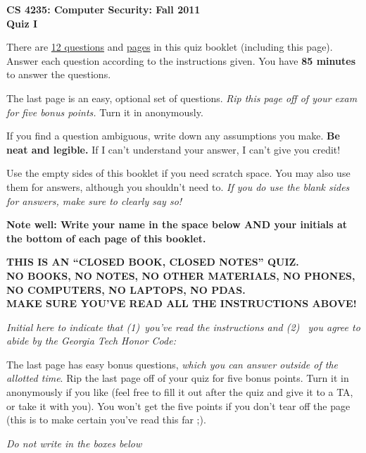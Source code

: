 \documentclass[11pt]{article}
\newcounter{answer}
\begin{document}
\begin{center}
{\Large{\bf CS 4235: Computer Security: Fall 2011} \\
 \vspace{.15in} \Huge{\bf Quiz I}} 
\vspace{.2in}

\begin{boxedminipage}[h]{6in}
There are \underline{12 questions} and
  \underline{\pageref{lastpage} pages} in this quiz booklet (including
  this page).  Answer each question according to the instructions given.
  You have {\bf 85 minutes} to answer the questions.

\vspace{.1in} The last page is an easy, optional set of questions.  {\em
  Rip this page off of your exam for five bonus points.}  Turn it in
anonymously.


\vspace{.1in} 
If you find a question ambiguous, write down any
assumptions you make.  {\bf Be neat and legible.}  If I can't
understand your answer, I can't give you credit!  

\vspace{.1in} 
Use the empty sides of this booklet if you need scratch space.  You
may also use them for answers, although you shouldn't need to.  {\em If you
do use the blank sides for answers, make sure to clearly say so!}

\vspace{.1in} 
{\bf Note well: Write your name in the space below AND your initials at the bottom of each
page of this booklet.}

\begin{center}{\bf THIS IS AN ``CLOSED BOOK, CLOSED NOTES'' QUIZ.\\
NO BOOKS, NO NOTES, NO OTHER MATERIALS, NO PHONES, NO COMPUTERS, NO
LAPTOPS, NO PDAS.\\ 
MAKE SURE YOU'VE READ ALL THE INSTRUCTIONS ABOVE!}
\end{center}
{\em Initial here to indicate that (1)~you've read the instructions and (2)~
you agree to abide by the Georgia Tech Honor Code: }



\vspace{.05in} The last page has easy bonus questions, {\em which you can
answer outside of the allotted time}.  Rip the last page off of your
quiz for five bonus points.  Turn it in anonymously if you like (feel
free to fill it out after the quiz and give it to a TA, or take it with you).  You
won't get the five points if you don't tear off the page (this is to
make certain you've read this far ;).
\fi 

\end{boxedminipage}
\end{center}
\vspace*{0.15in}
\begin{center}
{\it Do not write in the boxes below}
\end{center}
\end{document}
